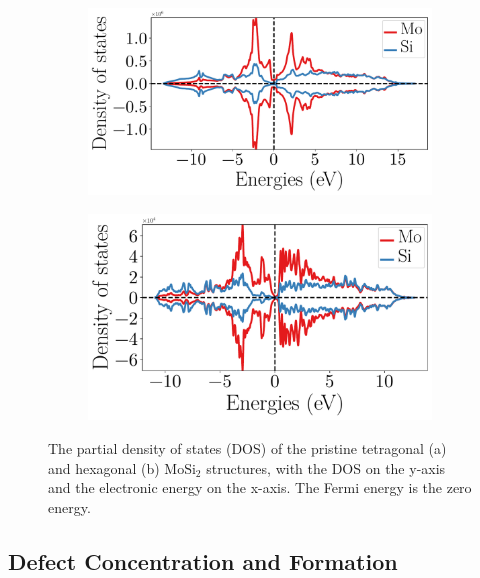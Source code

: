\documentclass[7.5pt]{article}
\theoremstyle{plain}
\theoremstyle{definition}
\newcommand{\<}{\langle}
\renewcommand{\>}{\rangle}
\begin{document}
\begin{figure}
\centering
\begin{subfigure}{.5\textwidth}
  \centering
\includegraphics[width=\linewidth]{img/partial_dos_MoSi2_tetragonal.pdf}
  \caption{}
\label{fig:DOS-mosi2-hexagonal}
\end{subfigure}%
\begin{subfigure}{.46\textwidth}
  \centering
\includegraphics[width=\linewidth]{img/partial_dos_MoSi2_hexagonal.pdf}
  \caption{}
\label{fig:DOS-mosi2-tetragonal}
\end{subfigure}
\caption{The partial density of states (DOS) of the pristine tetragonal (a) and hexagonal (b) $\text{Mo}\text{Si}_2$ structures, with the DOS on the y-axis and the electronic energy on the x-axis. The Fermi energy is the zero energy.}
\label{fig:DOS-mosi2}
\end{figure}



\clearpage
\subsection{Defect Concentration and Formation}
\end{document}
